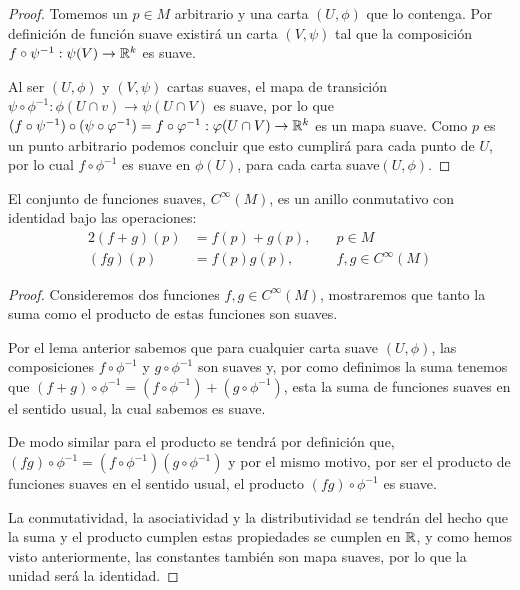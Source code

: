 \begin{proof}
  Tomemos un $p \in M$ arbitrario y una carta $(U, \phi)$ que lo contenga. Por definición de función suave existirá un carta $(V,\psi)$ tal que la composición $f \circ \psi^{-1}: \psi(V) \to \mathbb{R}^{k}$ es suave.

  Al ser $(U,\phi)$ y $(V,\psi)$ cartas suaves, el mapa de transición $\psi \circ \phi^{-1}: \phi(U \cap v) \to \psi(U \cap V)$ es suave, por lo que $(f \circ \psi^{-1}) \circ (\psi \circ \varphi^{-1}) = f \circ \varphi^{-1}: \varphi(U \cap V) \to \mathbb{R}^{k}$ es un mapa suave. Como $p$ es un punto arbitrario podemos concluir que esto cumplirá para cada punto de $U$, por lo cual $f \circ \phi^{-1}$ es suave en $\phi(U)$, para cada carta suave$(U,\phi)$.
\end{proof}

\begin{theorem}
	El conjunto de funciones suaves, $C^{\infty}(M)$, es un anillo conmutativo con identidad bajo las operaciones:
	\begin{alignat*}{2}
		(f+g)(p) & = f(p) + g(p), \quad & p \in M               \\
		(fg)(p)  & = f(p)g(p),          & f,g \in C^{\infty}(M)
	\end{alignat*}
\end{theorem}

\begin{proof}
  Consideremos dos funciones $f,g \in C^{\infty}(M)$, mostraremos que tanto la suma como el producto de estas funciones son suaves.

  Por el lema anterior sabemos que para cualquier carta suave $(U,\phi)$, las composiciones $f \circ \phi^{-1}$ y $g \circ \phi^{-1}$ son suaves y, por como definimos la suma tenemos que $(f + g)\circ \phi^{-1} = (f \circ \phi^{-1}) + (g \circ \phi^{-1})$, esta la suma de funciones suaves en el sentido usual, la cual sabemos es suave.

  De modo similar para el producto se tendrá por definición que, $(fg)\circ\phi^{-1} = (f \circ \phi^{-1}) (g \circ \phi^{-1})$ y por el mismo motivo, por ser el producto de funciones suaves en el sentido usual, el producto $(fg) \circ \phi^{-1}$ es suave.

  La conmutatividad, la asociatividad y la distributividad se tendrán del hecho que la suma y el producto cumplen estas propiedades se cumplen en $\mathbb{R}$, y como hemos visto anteriormente, las constantes también son mapa suaves, por lo que la unidad será la identidad.
\end{proof}
